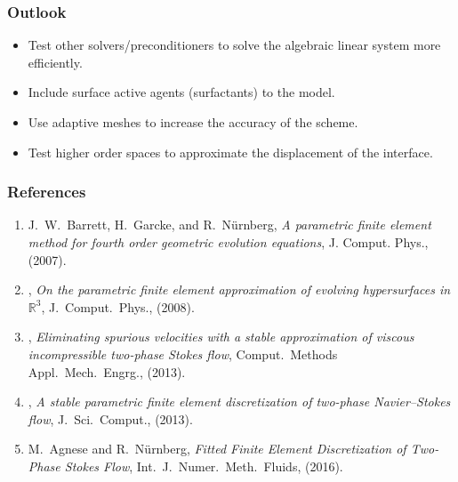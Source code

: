\documentclass{beamer}
\begin{document}
\begin{frame}
\frametitle{Outlook}

\begin{itemize}
\item Test other solvers/preconditioners to solve the algebraic linear system
more efficiently.
\item Include surface active agents (surfactants) to the model.
\item Use adaptive meshes to increase the accuracy of the scheme.
\item Test higher order spaces to approximate the displacement of the interface.
\end{itemize}
\end{frame}

\begin{frame}
\frametitle{References}

\begin{enumerate}
\item
{\sc J.~W.~Barrett, H.~Garcke, and R.~N\"urnberg}, {\em A parametric finite
element method for fourth order geometric evolution equations},
\blue J. Comput. Phys., \black (2007).

\item
\leavevmode\vrule height 2pt depth -1.6pt width 23pt,
{\em On the parametric finite element approximation of evolving hypersurfaces
in {${\mathbb R}^3$}},
\blue J.\ Comput.\ Phys., \black (2008).

\item
\leavevmode\vrule height 2pt depth -1.6pt width 23pt,
{\em Eliminating spurious velocities with a stable approximation of
viscous incompressible two-phase {S}tokes flow},
\blue Comput.\ Methods Appl.\ Mech.\ Engrg., \black (2013).

\item
\leavevmode\vrule height 2pt depth -1.6pt width 23pt,
{\em A stable parametric finite element discretization of two-phase
{N}avier--{S}tokes flow}, \blue J.\ Sci.\ Comput., \black (2013).

\item
{\sc M.~Agnese and R.~N\"urnberg}, {\em Fitted Finite Element Discretization of
Two-Phase {S}tokes Flow}, \blue Int.\ J.\ Numer.\ Meth.\ Fluids, \black (2016).
\end{enumerate}
\end{frame}
\end{document}
